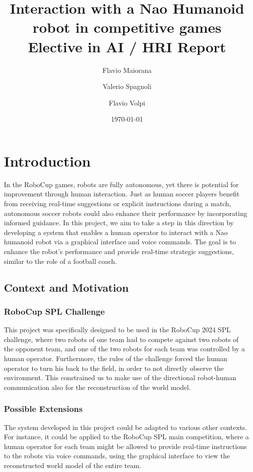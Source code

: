 \documentclass[a4paper, onecolumn, 12pt]{article}
\title{Interaction with a Nao Humanoid robot in competitive games \\ Elective in AI / HRI Report}
\author{Flavio Maiorana \and Valerio Spagnoli \and Flavio Volpi}
\date{\today}
\begin{document}
\maketitle

\section{Introduction}
\label{sec:intro}
In the RoboCup games, robots are fully autonomous, yet there is potential for 
improvement through human interaction. Just as human soccer players benefit from 
receiving real-time suggestions or explicit instructions during a match, 
autonomous soccer robots could also enhance their performance by incorporating 
informed guidance. 
In this project, we aim to take a step in this direction by developing a 
system that enables a human operator to interact with a Nao humanoid robot via a graphical 
interface and voice commands. The goal is to enhance the robot's performance and 
provide real-time strategic suggestions, similar to the role of a football coach.

\subsection{Context and Motivation}
\label{sec:context}

\subsubsection{RoboCup SPL Challenge}
This project was specifically designed to be used in the RoboCup 2024 SPL challenge, 
where two robots of one team had to compete against two robots of the opponent team, 
and one of the two robots for each team was controlled by a human operator. Furthermore, 
the rules of the challenge forced the human operator to turn his back to the field, 
in order to not directly observe the environment. This constrained us to make use of the
directional robot-human communication also for the reconstruction of the world model.

\subsubsection{Possible Extensions}  
The system developed in this project could be adapted to various other contexts. For instance, 
it could be applied to the RoboCup SPL main competition, where a human operator for each team 
might be allowed to provide real-time instructions to the robots via voice commands, using the 
graphical interface to view the reconstructed world model of the entire team.  
\end{document}
